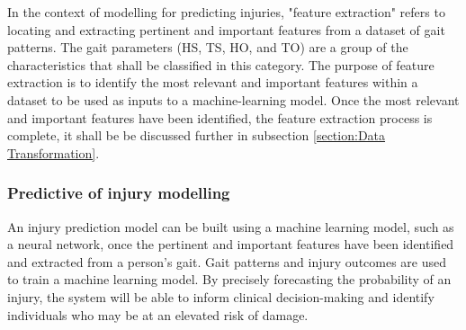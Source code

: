 In the context of modelling for predicting injuries, "feature extraction" refers to locating and extracting pertinent and important features from a dataset of gait patterns. The gait parameters (HS, TS, HO, and TO) are a group of the characteristics that shall be classified in this category. The purpose of feature extraction is to identify the most relevant and important features within a dataset to be used as inputs to a machine-learning model. Once the most relevant and important features have been identified, the feature extraction process is complete, it shall be be discussed further in subsection \ref{section:Data Transformation}.

\subsubsection{Predictive of injury modelling}

An injury prediction model can be built using a machine learning model, such as a neural network, once the pertinent and important features have been identified and extracted from a person's gait. Gait patterns and injury outcomes are used to train a machine learning model. By precisely forecasting the probability of an injury, the system will be able to inform clinical decision-making and identify individuals who may be at an elevated risk of damage.